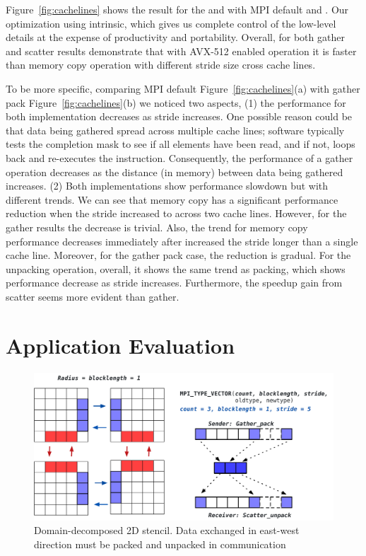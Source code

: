 \documentclass[conference]{IEEEtran}
\begin{document}
Figure~\ref{fig:cachelines} shows the result for the  and  with MPI default and \ourwork.
Our optimization using intrinsic, which gives us complete control of the low-level details at the expense of productivity and portability. 
Overall, for both gather and scatter results demonstrate that with AVX-512 enabled operation it is faster than memory copy operation with different stride size cross cache lines.

To be more specific, comparing MPI default Figure~\ref{fig:cachelines}(a) with gather pack Figure~\ref{fig:cachelines}(b) we noticed two aspects, (1) the performance for both implementation decreases as stride increases. One possible reason could be that data being gathered spread across multiple cache lines; software typically tests the completion mask to see if all elements have been read, and if not, loops back and re-executes the instruction. Consequently, the performance of a gather operation decreases as the distance (in memory) between data being gathered increases. 
(2) Both implementations show performance slowdown but with different trends.
We can see that memory copy has a significant performance reduction when the stride increased to across two cache lines. However, for the gather results the decrease is trivial.
Also, the trend for memory copy performance decreases immediately after increased the stride longer than a single cache line.
Moreover, for the gather pack case, the reduction is gradual.
For the unpacking operation, overall, it shows the same trend as packing, which shows performance decrease as stride increases. Furthermore, the speedup gain from scatter seems more evident than gather.

\section{Application Evaluation}\label{sec:application}

\begin{figure}[h]
    \centering
    \includegraphics[trim={0 0 0 1.5cm},clip, width=0.9\linewidth]{stencil3.pdf}
    \caption{Domain-decomposed 2D stencil. Data exchanged in east-west direction must be packed and unpacked in communication}
    \label{fig:stencil3}
\end{figure}
\end{document}
